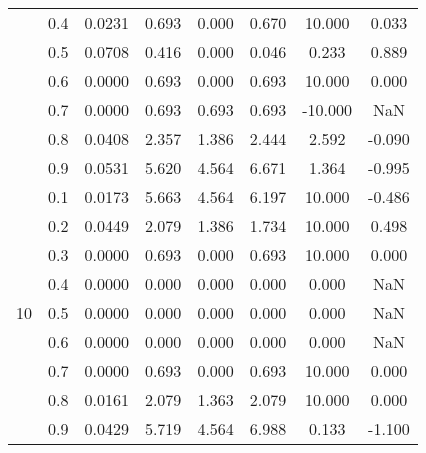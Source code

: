 \documentclass[11pt,a4paper]{report}
\begin{document}
\begin{longtable}{ | c | c || c | c | c | c | c | c | }
 & 0.4 & 0.0231 & 0.693 & 0.000 & 0.670 & 10.000 & 0.033 \\
 & 0.5 & 0.0708 & 0.416 & 0.000 & 0.046 & 0.233 & 0.889 \\
 & 0.6 & 0.0000 & 0.693 & 0.000 & 0.693 & 10.000 & 0.000 \\
 & 0.7 & 0.0000 & 0.693 & 0.693 & 0.693 & -10.000 & NaN \\
 & 0.8 & 0.0408 & 2.357 & 1.386 & 2.444 & 2.592 & -0.090 \\
 & 0.9 & 0.0531 & 5.620 & 4.564 & 6.671 & 1.364 & -0.995 \\
 \hline
\multirow{9}{*}{10} & 0.1 & 0.0173 & 5.663 & 4.564 & 6.197 & 10.000 & -0.486 \\
 & 0.2 & 0.0449 & 2.079 & 1.386 & 1.734 & 10.000 & 0.498 \\
 & 0.3 & 0.0000 & 0.693 & 0.000 & 0.693 & 10.000 & 0.000 \\
 & 0.4 & 0.0000 & 0.000 & 0.000 & 0.000 & 0.000 & NaN \\
 & 0.5 & 0.0000 & 0.000 & 0.000 & 0.000 & 0.000 & NaN \\
 & 0.6 & 0.0000 & 0.000 & 0.000 & 0.000 & 0.000 & NaN \\
 & 0.7 & 0.0000 & 0.693 & 0.000 & 0.693 & 10.000 & 0.000 \\
 & 0.8 & 0.0161 & 2.079 & 1.363 & 2.079 & 10.000 & 0.000 \\
 & 0.9 & 0.0429 & 5.719 & 4.564 & 6.988 & 0.133 & -1.100 \\
 \hline
\hline
\end{longtable}
\end{document}
